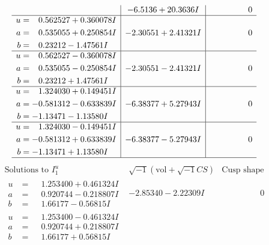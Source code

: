 \documentclass[1p]{elsarticle_modified}
\theoremstyle{definition}
\newcommand{\I}{\sqrt{-1}}
\begin{document}
$$\begin{array}{c|c|c}
 & -6.5136 + 20.3636 I & \phantom{-0.000000 } 0 \\ \hline\begin{aligned}
u &= \phantom{-}0.562527 + 0.360078 I \\
a &= \phantom{-}0.535055 + 0.250854 I \\
b &= \phantom{-}0.23212 - 1.47561 I\end{aligned}
 & -2.30551 + 2.41321 I & \phantom{-0.000000 } 0 \\ \hline\begin{aligned}
u &= \phantom{-}0.562527 - 0.360078 I \\
a &= \phantom{-}0.535055 - 0.250854 I \\
b &= \phantom{-}0.23212 + 1.47561 I\end{aligned}
 & -2.30551 - 2.41321 I & \phantom{-0.000000 } 0 \\ \hline\begin{aligned}
u &= \phantom{-}1.324030 + 0.149451 I \\
a &= -0.581312 - 0.633839 I \\
b &= -1.13471 - 1.13580 I\end{aligned}
 & -6.38377 + 5.27943 I & \phantom{-0.000000 } 0 \\ \hline\begin{aligned}
u &= \phantom{-}1.324030 - 0.149451 I \\
a &= -0.581312 + 0.633839 I \\
b &= -1.13471 + 1.13580 I\end{aligned}
 & -6.38377 - 5.27943 I & \phantom{-0.000000 } 0\\
 \hline 
 \end{array}$$\newpage$$\begin{array}{c|c|c}  
\text{Solutions to }I^u_{1}& \I (\text{vol} + \sqrt{-1}CS) & \text{Cusp shape}\\
 \hline 
\begin{aligned}
u &= \phantom{-}1.253400 + 0.461324 I \\
a &= \phantom{-}0.920744 - 0.218807 I \\
b &= \phantom{-}1.66177 - 0.56815 I\end{aligned}
 & -2.85340 - 2.22309 I & \phantom{-0.000000 } 0 \\ \hline\begin{aligned}
u &= \phantom{-}1.253400 - 0.461324 I \\
a &= \phantom{-}0.920744 + 0.218807 I \\
b &= \phantom{-}1.66177 + 0.56815 I\end{aligned}

\end{array}$$
\end{document}
